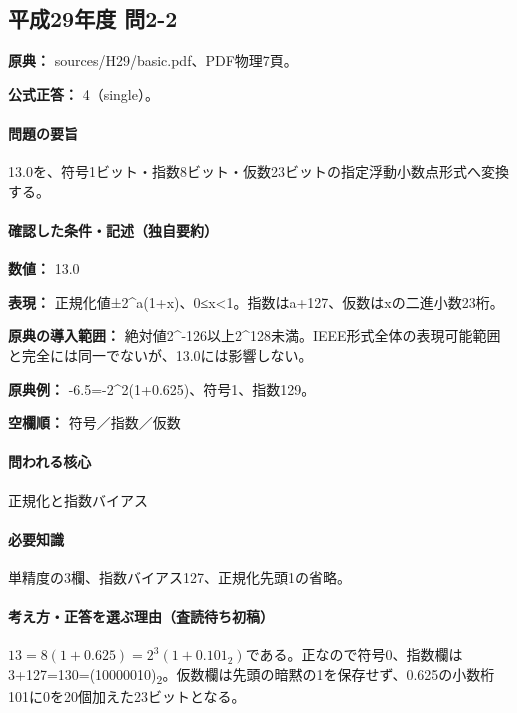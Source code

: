 \subsection{平成29年度 問2-2}
\label{q:h29-reg-basic-2-2}

\noindent\textbf{原典：} sources/H29/basic.pdf、PDF物理7頁。

\textbf{公式正答：} 4（single）。

\paragraph{問題の要旨} 13.0を、符号1ビット・指数8ビット・仮数23ビットの指定浮動小数点形式へ変換する。

\paragraph{確認した条件・記述（独自要約）}\mbox{}\par

\noindent\textbf{数値：} 13.0\par

\noindent\textbf{表現：} 正規化値±2\textasciicircum{}a(1+x)、0≤x<1。指数はa+127、仮数はxの二進小数23桁。\par

\noindent\textbf{原典の導入範囲：} 絶対値2\textasciicircum{}-126以上2\textasciicircum{}128未満。IEEE形式全体の表現可能範囲と完全には同一でないが、13.0には影響しない。\par

\noindent\textbf{原典例：} -6.5=-2\textasciicircum{}2(1+0.625)、符号1、指数129。\par

\noindent\textbf{空欄順：} 符号／指数／仮数\par

\paragraph{問われる核心} 正規化と指数バイアス

\paragraph{必要知識} 単精度の3欄、指数バイアス127、正規化先頭1の省略。

\paragraph{考え方・正答を選ぶ理由（査読待ち初稿）} \(13=8(1+0.625)=2^3(1+0.101_2)\)である。正なので符号0、指数欄は3+127=\allowbreak{}130=\allowbreak{}(10000010)\textsubscript{2}。仮数欄は先頭の暗黙の1を保存せず、0.625の小数桁101に0を20個加えた23ビットとなる。

